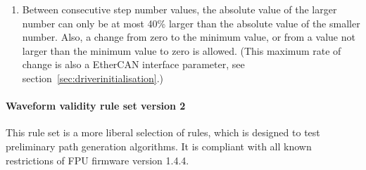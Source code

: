 \documentclass[11pt,a4paper]{scrartcl}
\begin{document}
\begin{enumerate}
\item Between consecutive step number values, the absolute value of
  the larger number can only be at most 40\% larger than the absolute
  value of the smaller number. Also, a change from zero to the minimum
  value, or from a value not larger than the minimum value to zero is
  allowed. (This maximum rate of change is also a EtherCAN interface parameter, see
  section~\ref{sec:driverinitialisation}.)

  
\end{enumerate}

\paragraph{Waveform validity rule set version 2}

This rule set is a more liberal selection of rules, which is designed
to test preliminary path generation algorithms. It is compliant with
all known restrictions of FPU firmware version 1.4.4.
\end{document}
